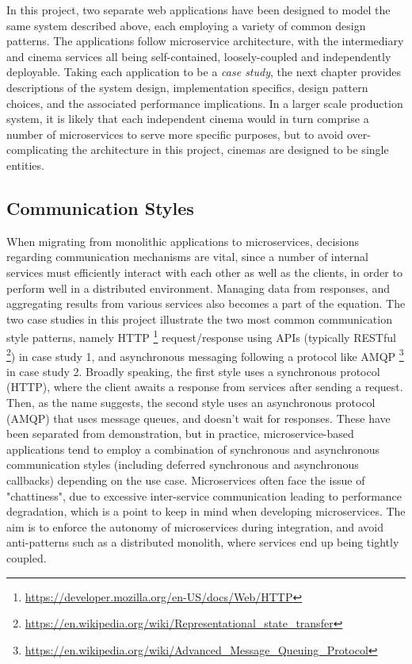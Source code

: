 In this project, two separate web applications have been designed to model the same system described above, each employing a variety of common design patterns. The applications follow microservice architecture, with the intermediary and cinema services all being self-contained, loosely-coupled and independently deployable. Taking each application to be a \textit{case study}, the next chapter provides descriptions of the system design, implementation specifics, design pattern choices, and the associated performance implications. In a larger scale production system, it is likely that each independent cinema would in turn comprise a number of microservices to serve more specific purposes, but to avoid over-complicating the architecture in this project, cinemas are designed to be single entities.

\subsection{Communication Styles}

When migrating from monolithic applications to microservices, decisions regarding communication mechanisms are vital, since a number of internal services must efficiently interact with each other as well as the clients, in order to perform well in a distributed environment. Managing data from responses, and aggregating results from various services also becomes a part of the equation. The two case studies in this project illustrate the two most common communication style patterns, namely HTTP \footnote{\url{https://developer.mozilla.org/en-US/docs/Web/HTTP}} request/response using APIs (typically RESTful \footnote{\url{https://en.wikipedia.org/wiki/Representational_state_transfer}}) in case study 1, and asynchronous messaging following a protocol like AMQP \footnote{\url{https://en.wikipedia.org/wiki/Advanced_Message_Queuing_Protocol}} in case study 2. Broadly speaking, the first style uses a synchronous protocol (HTTP), where the client awaits a response from services after sending a request. Then, as the name suggests, the second style uses an asynchronous protocol (AMQP) that uses message queues, and doesn't wait for responses. These have been separated from demonstration, but in practice, microservice-based applications tend to employ a combination of synchronous and asynchronous communication styles (including deferred synchronous and asynchronous callbacks) depending on the use case. Microservices often face the issue of "chattiness", due to excessive inter-service communication leading to performance degradation, which is a point to keep in mind when developing microservices. The aim is to enforce the autonomy of microservices during integration, and avoid anti-patterns such as a distributed monolith, where services end up being tightly coupled.

